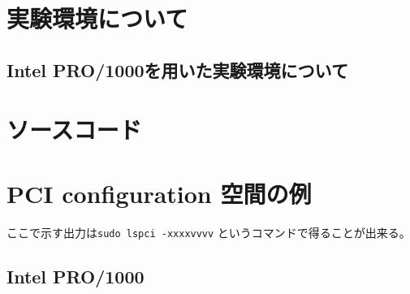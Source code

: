\documentclass[a4paper,11pt,report]{ltjsbook}
\begin{document}
\appendix
\chapter{実験環境について}
\section{Intel PRO/1000を用いた実験環境について}
\label{letsnote}

\chapter{ソースコード}

\chapter{PCI configuration 空間の例}

ここで示す出力は\texttt{sudo lspci -xxxxvvvv} というコマンドで得ることが出来る。

\section{Intel PRO/1000}
\end{document}
